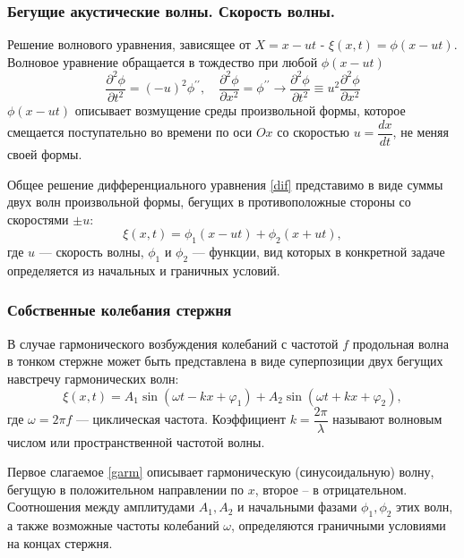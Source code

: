 \documentclass[a4paper,12pt]{article}
\begin{document}
	\subsubsection*{Бегущие акустические волны. Скорость волны.}
	Решение волнового уравнения, зависящее от $X=x-u t$ - $\xi(x, t)=\phi(x-u t)$. Волновое уравнение обращается в тождество при любой $\phi(x-u t)$
	$$
	\frac{\partial^{2} \phi}{\partial t^{2}}=(-u)^{2} \phi^{\prime \prime}, \quad \frac{\partial^{2} \phi}{\partial x^{2}}=\phi^{\prime \prime} \rightarrow \frac{\partial^{2} \phi}{\partial t^{2}} \equiv u^{2} \frac{\partial^{2} \phi}{\partial x^{2}}
	$$
	$\phi(x-u t)$ описывает	возмущение среды произвольной формы, которое смещается поступательно во времени по оси $Ox$ со скоростью $u = \dfrac{d x}{d t}$, не меняя своей формы.
	
	Общее решение дифференциального уравнения \ref{dif} представимо в виде суммы двух волн произвольной формы, бегущих в противоположные стороны со скоростями $\pm u$:
	$$
	\xi(x, t)=\phi_{1}(x-u t)+\phi_{2}(x+u t),
	$$
	где $u$ — скорость волны, $\phi_1$ и $\phi_2$ — функции, вид которых в конкретной задаче определяется из начальных и граничных условий.
	
	\subsubsection*{Собственные колебания стержня}
	В случае гармонического возбуждения колебаний с частотой $f$ продольная волна в тонком стержне может быть представлена в виде суперпозиции двух бегущих навстречу гармонических волн:
	\begin{equation} 
		\label{garm}
		\xi(x, t)=A_{1} \sin \left(\omega t-k x+\varphi_{1}\right)+A_{2} \sin \left(\omega t+k x+\varphi_{2}\right),
	\end{equation}
	где $\omega = 2 \pi f$ — циклическая частота. Коэффициент $k = \dfrac{2 \pi}{\lambda}$ называют волновым числом или пространственной частотой волны. 
	
	Первое слагаемое \ref{garm} описывает гармоническую (синусоидальную) волну, бегущую в положительном направлении по $x$, второе -- в отрицательном. Соотношения между амплитудами $A_1, A_2$ и начальными фазами $\phi_1, \phi_2$ этих волн, а также возможные частоты колебаний $\omega$, определяются граничными условиями на концах стержня. 
	
\end{document}
